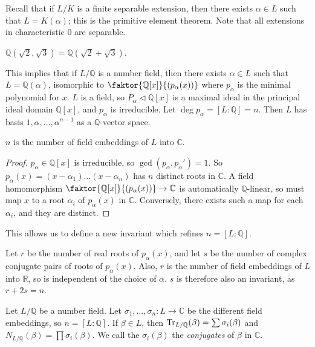Recall that if \( L / K \) is a finite separable extension, then there exists \( \alpha \in L \) such that \( L = K(\alpha) \); this is the primitive element theorem.
Note that all extensions in characteristic 0 are separable.
\begin{example}
    \( \mathbb Q(\sqrt 2, \sqrt 3) = \mathbb Q(\sqrt 2 + \sqrt 3) \).
\end{example}
This implies that if \( L / \mathbb Q \) is a number field, then there exists \( \alpha \in L \) such that \( L = \mathbb Q(\alpha) \), isomorphic to \( \faktor{\mathbb Q[x]}{(p_\alpha(x))} \) where \( p_\alpha \) is the minimal polynomial for \( x \).
\( L \) is a field, so \( P_\alpha \vartriangleleft \mathbb Q[x] \) is a maximal ideal in the principal ideal domain \( \mathbb Q[x] \), and \( p_\alpha \) is irreducible.
Let \( \deg p_\alpha = [L:\mathbb Q] = n \).
Then \( L \) has basis \( 1, \alpha, \dots, \alpha^{n-1} \) as a \( \mathbb Q \)-vector space.
\begin{lemma}
    \( n \) is the number of field embeddings of \( L \) into \( \mathbb C \).
\end{lemma}
\begin{proof}
    \( p_\alpha \in \mathbb Q[x] \) is irreducible, so \( \gcd(p_\alpha, p_\alpha') = 1 \).
    So \( p_\alpha(x) = (x-\alpha_1)\dots(x-\alpha_n) \) has \( n \) distinct roots in \( \mathbb C \).
    A field homomorphism \( \faktor{\mathbb Q[x]}{(p_\alpha(x))} \to \mathbb C \) is automatically \( \mathbb Q \)-linear, so must map \( x \) to a root \( \alpha_i \) of \( p_\alpha(x) \) in \( \mathbb C \).
    Conversely, there exists such a map for each \( \alpha_i \), and they are distinct.
\end{proof}
This allows us to define a new invariant which refines \( n = [L:\mathbb Q] \).
\begin{definition}
    Let \( r \) be the number of real roots of \( p_\alpha(x) \), and let \( s \) be the number of complex conjugate pairs of roots of \( p_\alpha(x) \).
    Also, \( r \) is the number of field embeddings of \( L \) into \( \mathbb R \), so is independent of the choice of \( \alpha \).
    \( s \) is therefore also an invariant, as \( r + 2s = n \).
\end{definition}
\begin{lemma}
    Let \( L / \mathbb Q \) be a number field.
    Let \( \sigma_1, \dots, \sigma_n \colon L \to \mathbb C \) be the different field embeddings, so \( n = [L:\mathbb Q]\).
    If \( \beta \in L \), then \( \Tr_{L/\mathbb Q}(\beta) = \sum \sigma_i(\beta) \) and \( N_{L/\mathbb Q}(\beta) = \prod \sigma_i(\beta) \).
    We call the \( \sigma_i(\beta) \) the \emph{conjugates} of \( \beta \) in \( \mathbb C \).
\end{lemma}
